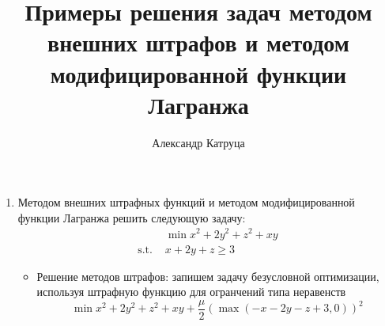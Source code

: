 \documentclass[12pt]{article}
\title{Примеры решения задач методом внешних штрафов и методом модифицированной функции Лагранжа}
\author{Александр Катруца}
\date{}
\begin{document}
\maketitle

\begin{enumerate}
\item Методом внешних штрафных функций и методом модифицированной функции Лагранжа решить следующую задачу:
\begin{equation*}
\begin{split}
& \min x^2 + 2y^2 + z^2 + xy\\
\text{s.t. } & x + 2y + z \geq 3
\end{split}
\end{equation*}
\begin{itemize}
\item Решение методов штрафов: запишем задачу безусловной оптимизации, используя штрафную функцию для огранчений типа неравенств
\begin{equation}
\min x^2 + 2y^2 + z^2 + xy + \frac{\mu}{2} (\max(-x - 2y - z + 3, 0))^2
\label{eq::penalty_problem}
\end{equation}


\end{itemize}
\end{enumerate}
\end{document}
